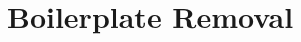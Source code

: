 


\begin{comment}
\h{.*}\begin{code}
import Prelude hiding (mapM)
import GHC.Exts(build)
import Data.Maybe
import Data.Monoid
import Data.Typeable
import Data.Generics hiding (Unit)
import Control.Monad.State hiding (mapM)
import Data.Traversable(Traversable,mapM)
import Data.Foldable(Foldable)

instance Eq Expr
instance Eq (a -> b)
instance Eq (Str a)
instance Typeable Expr
instance Typeable Stmt
instance Traversable Str
instance Foldable Str

class Compos t where
    compos :: (forall a. a -> m a) -> (forall a b. m (a -> b) -> m a -> m b) -> (forall a. t a -> m (t a)) -> t c -> m (t c)
composOp :: Compos t => (forall a. t a -> t a) -> t c -> t c
composOpM :: (Compos t, Monad m) => (forall a. t a -> m (t a)) -> t c -> m (t c)
composOpM_ :: (Compos t, Monad m) => (forall a. t a -> m ()) -> t c -> m ()
composOpMonoid :: (Compos t, Monoid m) => (forall a. t a -> m) -> t c -> m
composOpMPlus :: (Compos t, MonadPlus m) => (forall a. t a -> m b) -> t c -> m b
composOpFold :: Compos t => b -> (b -> b -> b) -> (forall a. t a -> b) -> t c -> b
\end{code}
\end{comment}


\chapter{Boilerplate Removal}
\label{chp:uniplate}

